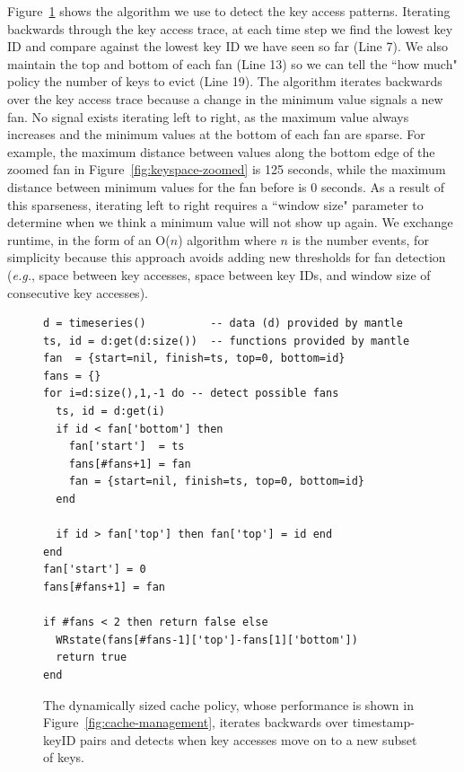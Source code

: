 Figure~\ref{src:dyn-cache} shows the algorithm we use to detect the key access
patterns. Iterating backwards through the key access trace, at each time step we
find the lowest key ID and compare against the lowest key ID we have seen so
far (Line 7). We also maintain the top and bottom of each fan (Line 13) so we
can tell the ``how much" policy the number of keys to evict (Line 19).  The
algorithm iterates backwards over the key access trace because a change in the
minimum value signals a new fan. No signal exists iterating left to right, as
the maximum value always increases and the minimum values at the bottom of each
fan are sparse.  For example, the maximum distance between values along the
bottom edge of the zoomed fan in Figure~\ref{fig:keyspace-zoomed} is 125
seconds, while the maximum distance between minimum values for the fan before
is 0 seconds. As a result of this sparseness, iterating left to right requires
a ``window size" parameter to determine when we think a minimum value will not
show up again.  We exchange runtime, in the form of an O(\(n\)) algorithm where
\(n\) is the number events, for simplicity because this approach avoids adding
new thresholds for fan detection ({\it e.g.}, space between key accesses, space
between key IDs, and window size of consecutive key accesses).


\begin{figure}[h]
\footnotesize
\begin{verbatim}
d = timeseries()          -- data (d) provided by mantle
ts, id = d:get(d:size())  -- functions provided by mantle
fan  = {start=nil, finish=ts, top=0, bottom=id}
fans = {}
for i=d:size(),1,-1 do -- detect possible fans
  ts, id = d:get(i)
  if id < fan['bottom'] then
    fan['start']  = ts
    fans[#fans+1] = fan 
    fan = {start=nil, finish=ts, top=0, bottom=id}
  end 

  if id > fan['top'] then fan['top'] = id end 
end
fan['start'] = 0 
fans[#fans+1] = fan 

if #fans < 2 then return false else
  WRstate(fans[#fans-1]['top']-fans[1]['bottom'])
  return true
end
\end{verbatim}
\caption{The dynamically sized cache policy, whose performance is shown in 
Figure~\ref{fig:cache-management}, iterates backwards over timestamp-keyID pairs
and detects when key accesses move on to a new subset of
keys.\label{src:dyn-cache}}
\end{figure}
